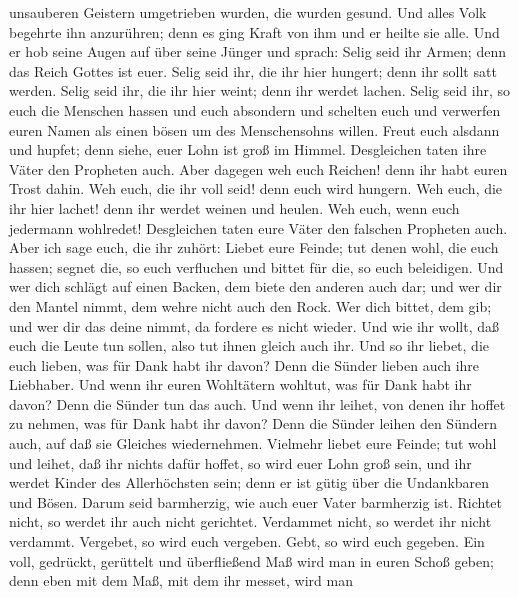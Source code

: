 unsauberen Geistern umgetrieben wurden, die wurden gesund. 
Und alles Volk begehrte ihn anzurühren; denn es ging Kraft von ihm und
er heilte sie alle.  Und er hob seine Augen auf über seine
Jünger und sprach: Selig seid ihr Armen; denn das Reich Gottes ist euer.
 Selig seid ihr, die ihr hier hungert; denn ihr sollt satt
werden. Selig seid ihr, die ihr hier weint; denn ihr werdet lachen.
 Selig seid ihr, so euch die Menschen hassen und euch
absondern und schelten euch und verwerfen euren Namen als einen bösen um
des Menschensohns willen.  Freut euch alsdann und hupfet;
denn siehe, euer Lohn ist groß im Himmel. Desgleichen taten ihre Väter
den Propheten auch.  Aber dagegen weh euch Reichen! denn
ihr habt euren Trost dahin.  Weh euch, die ihr voll seid!
denn euch wird hungern. Weh euch, die ihr hier lachet! denn ihr werdet
weinen und heulen.  Weh euch, wenn euch jedermann
wohlredet! Desgleichen taten eure Väter den falschen Propheten auch.
 Aber ich sage euch, die ihr zuhört: Liebet eure Feinde;
tut denen wohl, die euch hassen;  segnet die, so euch
verfluchen und bittet für die, so euch beleidigen.  Und wer
dich schlägt auf einen Backen, dem biete den anderen auch dar; und wer
dir den Mantel nimmt, dem wehre nicht auch den Rock.  Wer
dich bittet, dem gib; und wer dir das deine nimmt, da fordere es nicht
wieder.  Und wie ihr wollt, daß euch die Leute tun sollen,
also tut ihnen gleich auch ihr.  Und so ihr liebet, die
euch lieben, was für Dank habt ihr davon? Denn die Sünder lieben auch
ihre Liebhaber.  Und wenn ihr euren Wohltätern wohltut, was
für Dank habt ihr davon? Denn die Sünder tun das auch.  Und
wenn ihr leihet, von denen ihr hoffet zu nehmen, was für Dank habt ihr
davon? Denn die Sünder leihen den Sündern auch, auf daß sie Gleiches
wiedernehmen.  Vielmehr liebet eure Feinde; tut wohl und
leihet, daß ihr nichts dafür hoffet, so wird euer Lohn groß sein, und
ihr werdet Kinder des Allerhöchsten sein; denn er ist gütig über die
Undankbaren und Bösen.  Darum seid barmherzig, wie auch
euer Vater barmherzig ist.  Richtet nicht, so werdet ihr
auch nicht gerichtet. Verdammet nicht, so werdet ihr nicht verdammt.
Vergebet, so wird euch vergeben.  Gebt, so wird euch
gegeben. Ein voll, gedrückt, gerüttelt und überfließend Maß wird man in
euren Schoß geben; denn eben mit dem Maß, mit dem ihr messet, wird man
